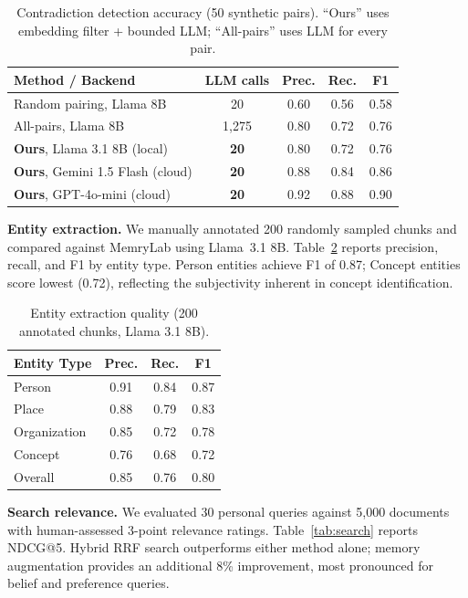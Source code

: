 \documentclass[conference]{IEEEtran}
\begin{document}
\begin{table}[t]
\caption{Contradiction detection accuracy (50 synthetic pairs). ``Ours'' uses embedding filter + bounded LLM; ``All-pairs'' uses LLM for every pair.}
\label{tab:contradiction}
\footnotesize
\begin{tabular}{lcccc}
\toprule
\textbf{Method / Backend} & \textbf{LLM calls} & \textbf{Prec.} & \textbf{Rec.} & \textbf{F1} \\
\midrule
Random pairing, Llama 8B  & 20  & 0.60 & 0.56 & 0.58 \\
All-pairs, Llama 8B        & 1,275 & 0.80 & 0.72 & 0.76 \\
\midrule
\textbf{Ours}, Llama 3.1 8B (local)     & \textbf{20} & 0.80 & 0.72 & 0.76 \\
\textbf{Ours}, Gemini 1.5 Flash (cloud) & \textbf{20} & 0.88 & 0.84 & 0.86 \\
\textbf{Ours}, GPT-4o-mini (cloud)      & \textbf{20} & 0.92 & 0.88 & 0.90 \\
\bottomrule
\end{tabular}
\end{table}

\textbf{Entity extraction.} We manually annotated 200 randomly sampled chunks and compared against MemryLab using Llama~3.1 8B. Table~\ref{tab:entity-quality} reports precision, recall, and F1 by entity type. Person entities achieve F1 of 0.87; Concept entities score lowest (0.72), reflecting the subjectivity inherent in concept identification.

\begin{table}[t]
\caption{Entity extraction quality (200 annotated chunks, Llama 3.1 8B).}
\label{tab:entity-quality}
\footnotesize
\begin{tabular}{lccc}
\toprule
\textbf{Entity Type} & \textbf{Prec.} & \textbf{Rec.} & \textbf{F1} \\
\midrule
Person       & 0.91 & 0.84 & 0.87 \\
Place        & 0.88 & 0.79 & 0.83 \\
Organization & 0.85 & 0.72 & 0.78 \\
Concept      & 0.76 & 0.68 & 0.72 \\
\midrule
Overall      & 0.85 & 0.76 & 0.80 \\
\bottomrule
\end{tabular}
\end{table}

\textbf{Search relevance.} We evaluated 30 personal queries against 5,000 documents with human-assessed 3-point relevance ratings. Table~\ref{tab:search} reports NDCG@5. Hybrid RRF search outperforms either method alone; memory augmentation provides an additional 8\% improvement, most pronounced for belief and preference queries.
\end{document}
